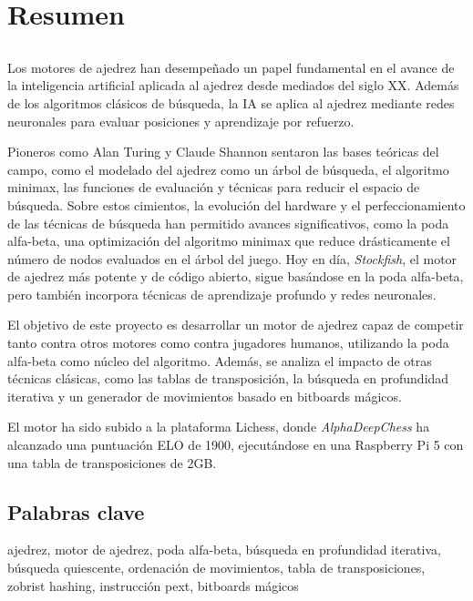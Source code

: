 \chapter*{Resumen}

\section*{\tituloPortadaVal}

Los motores de ajedrez han desempeñado un papel fundamental en el avance de la inteligencia artificial aplicada al ajedrez desde mediados del siglo XX. Además de los algoritmos clásicos de búsqueda, la IA se aplica al ajedrez mediante redes neuronales para evaluar posiciones y aprendizaje por refuerzo.

\vspace{1em}

\noindent Pioneros como Alan Turing y Claude Shannon sentaron las bases teóricas del campo, como el modelado del ajedrez como un árbol de búsqueda, el algoritmo minimax, las funciones de evaluación y técnicas para reducir el espacio de búsqueda. Sobre estos cimientos, la evolución del hardware y el perfeccionamiento de las técnicas de búsqueda han permitido avances significativos, como la poda alfa-beta, una optimización del algoritmo minimax que reduce drásticamente el número de nodos evaluados en el árbol del juego. Hoy en día, \textit{Stockfish}, el motor de ajedrez más potente y de código abierto, sigue basándose en la poda alfa-beta, pero también incorpora técnicas de aprendizaje profundo y redes neuronales.

\vspace{1em}

El objetivo de este proyecto es desarrollar un motor de ajedrez capaz de competir tanto contra otros motores como contra jugadores humanos, utilizando la poda alfa-beta como núcleo del algoritmo. Además, se analiza el impacto de otras técnicas clásicas, como las tablas de transposición, la búsqueda en profundidad iterativa y un generador de movimientos basado en bitboards mágicos.

\vspace{1em}

El motor ha sido subido a la plataforma Lichess, donde \textit{AlphaDeepChess} ha alcanzado una puntuación ELO de 1900, ejecutándose en una Raspberry Pi 5 con una tabla de transposiciones de 2GB.

\section*{Palabras clave}
   
\noindent ajedrez, motor de ajedrez, poda alfa-beta, búsqueda en profundidad iterativa, búsqueda quiescente, ordenación de movimientos, tabla de transposiciones, zobrist hashing, instrucción pext, bitboards mágicos 
